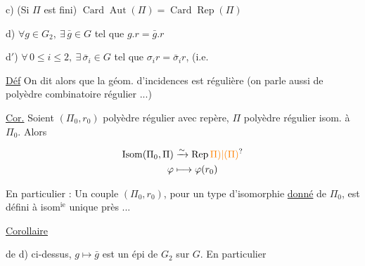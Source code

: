 c) (Si $\Pi$ est fini) $\operatorname{Card}\operatorname{Aut}(\Pi)=\operatorname{Card}\operatorname{Rep}(\Pi)$

d) $\forall g\in G_2,\ \exists\,\bar g\in G$ tel que $g.r=\bar g.r$

d$'$) $\forall\,0\leq i\leq2,\ \exists\,\bar\sigma_i\in G$ tel que $\sigma_i r=\bar\sigma_i r$, (i.e.


\uline{Déf} On dit alors que la géom. d'incidences est régulière (on parle aussi de polyèdre combinatoire régulier ...)

\uline{Cor.} Soient $(\Pi_0,r_0)$ polyèdre régulier avec repère, $\Pi$ polyèdre régulier isom. à $\Pi_0$. Alors

\[
 \begin{aligned}
 \operatorname{Isom}(\Pi_0,\Pi)&\xrightarrow{\sim}\operatorname{Rep}\unsure{\Pi)|(\Pi)}\\
 \varphi&\longmapsto\varphi(r_0)
 \end{aligned}
\]

En particulier : Un couple $(\Pi_0,r_0)$, pour un type d'isomorphie \uline{donné} de $\Pi_0$, est défini à isom$^{\mathrm{ie}}$ unique près ...

\uline{Corollaire}


  de d) ci-dessus, $g\mapsto\bar g$ est un épi de $G_2$ sur $G$. En particulier



\deleted{[ Soit $\Pi=(S,\ldots)$ une géométrie d'incidences, $R^+\subset E=\operatorname{Rep},\ R^-=E\smallsetminus R^+$. Conditions équivalentes}

